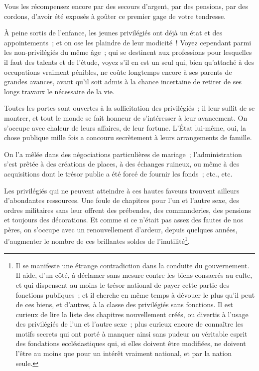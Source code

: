 \documentclass[french,twoside]{book} %
\begin{document}
Vous les récompensez encore par des secours d’argent, par des pensions, par des cordons, d’avoir été exposés à goûter ce premier gage de votre tendresse.\par
À peine sortis de l’enfance, les jeunes privilégiés ont déjà un état et des appointements ; et on ose les plaindre de leur modicité ! Voyez cependant parmi les non-privilégiés du même âge ; qui se destinent aux professions pour lesquelles il faut des talents et de l’étude, voyez s’il en est un seul qui, bien qu’attaché à des occupations vraiment pénibles, ne coûte longtemps encore à ses parents de grandes avances, avant qu’il soit admis à la chance incertaine de retirer de ses longs travaux le nécessaire de la vie.\par
Toutes les portes sont ouvertes à la sollicitation des privilégiés ; il leur suffit de se montrer, et tout le monde se fait honneur de s’intéresser à leur avancement. On s’occupe avec chaleur de leurs affaires, de leur fortune. L’État lui-même, oui, la chose publique mille fois a concouru secrètement à leurs arrangements de famille.\par
On l’a mêlée dans des négociations particulières de mariage ; l’administration s’est prêtée à des créations de places, à des échanges ruineux, ou même à des acquisitions dont le trésor public a été forcé de fournir les fonds ; etc., etc.\par
Les privilégiés qui ne peuvent atteindre à ces hautes faveurs trouvent ailleurs d’abondantes ressources. Une foule de chapitres pour l’un et l’autre sexe, des ordres militaires sans leur offrent des prébendes, des commanderies, des pensions et toujours des décorations. Et comme si ce n’était pas assez des fautes de nos pères, on s’occupe avec un renouvellement d’ardeur, depuis quelques années, d’augmenter le nombre de ces brillantes soldes de l’inutilité\footnote{Il se manifeste une étrange contradiction dans la conduite du gouvernement. Il aide, d’un côté, à déclamer sans mesure contre les biens consacrés au culte, et qui dispensent au moins le trésor national de payer cette partie des fonctions publiques ; et il cherche en même temps à dévouer le plus qu’il peut de ces biens, et d’autres, à la classe des privilégiés sans fonctions. Il est curieux de lire la liste des chapitres nouvellement créés, ou divertis à l’usage des privilégiés de l’un et l’autre sexe ; plus curieux encore de connaître les motifs secrets qui ont porté à manquer ainsi sans pudeur au véritable esprit des fondations ecclésiastiques qui, si elles doivent être modifiées, ne doivent l’être au moins que pour un intérêt vraiment national, et par la nation seule.}.\par
\end{document}
